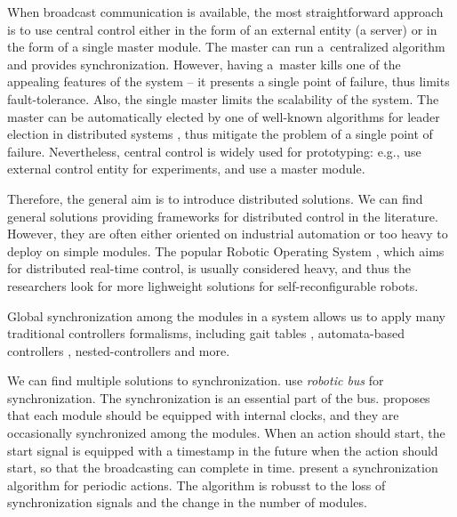 \bigskip

When broadcast communication is available, the most straightforward approach is
to use central control either in the form of an external entity (a server) or in
the form of a single master module. The master can run a~centralized algorithm
and provides synchronization. However, having a~master kills one of the
appealing features of the system -- it presents a single point of failure, thus
limits fault-tolerance. Also, the single master limits the scalability of the
system. The master can be automatically elected by one of well-known algorithms
for leader election in distributed systems \cite{baca2016coordination}, thus
mitigate the problem of a single point of failure. Nevertheless, central control
is widely used for prototyping: e.g., \cite{DBLP:journals/ijrr/KurokawaTKKHM08,
DBLP:conf/icra/TosunDJKCY18} use external control entity for experiments, and
\cite{superbotroller} use a master module.

Therefore, the general aim is to introduce distributed solutions. We can find
general solutions providing frameworks for distributed control in the
literature. However, they are often either oriented on industrial automation
or too heavy to deploy on simple modules. The popular Robotic Operating System
\cite{DBLP:journals/corr/abs-1809-02595}, which aims for distributed real-time
control, is usually considered heavy, and thus the researchers look for more
lighweight solutions for self-reconfigurable robots.

Global synchronization among the modules in a system allows us to apply many
traditional controllers formalisms, including gait tables
\cite{DBLP:conf/icarcv/KurokawaKYTMK02, DBLP:conf/iros/YimSSPDT07a},
automata-based controllers \cite{DBLP:journals/procedia/PouyaAMI11,
DBLP:journals/arobots/JingTYK18}, nested-controllers \cite{1159219} and more.

We can find multiple solutions to synchronization.
\textcite{DBLP:journals/ijrr/ParkCTY08} use \emph{robotic bus} \cite{roboticbus}
for synchronization. The synchronization is an essential part of the bus.
\textcite{yim1994locomotion} proposes that each module should be equipped with
internal clocks, and they are occasionally synchronized among the modules. When
an action should start, the start signal is equipped with a timestamp in the
future when the action should start, so that the broadcasting can complete in
time. \textcite{stoy2002global} present a synchronization algorithm for periodic
actions. The algorithm is robusst to the loss of synchronization signals and the
change in the number of modules.

